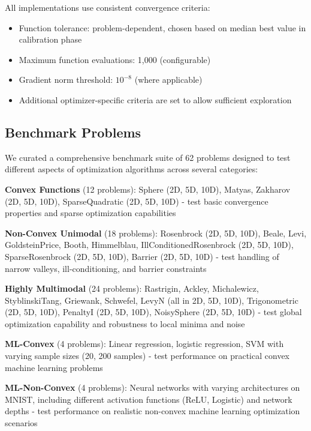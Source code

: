 All implementations use consistent convergence criteria:

\begin{itemize}
\tightlist
\item
  Function tolerance: problem-dependent, chosen based on median best value in calibration phase
\item
  Maximum function evaluations: 1,000 (configurable)
\item
  Gradient norm threshold: \(10^{-8}\) (where applicable)
\item
  Additional optimizer-specific criteria are set to allow sufficient exploration
\end{itemize}

\hypertarget{benchmark-problems}{%
\subsection{Benchmark Problems}\label{benchmark-problems}}

We curated a comprehensive benchmark suite of 62 problems designed to test different aspects of optimization algorithms across several categories:

\textbf{Convex Functions} (12 problems): Sphere (2D, 5D, 10D), Matyas, Zakharov (2D, 5D, 10D), SparseQuadratic (2D, 5D, 10D) - test basic convergence properties and sparse optimization capabilities

\textbf{Non-Convex Unimodal} (18 problems): Rosenbrock (2D, 5D, 10D), Beale, Levi, GoldsteinPrice, Booth, Himmelblau, IllConditionedRosenbrock (2D, 5D, 10D), SparseRosenbrock (2D, 5D, 10D), Barrier (2D, 5D, 10D) - test handling of narrow valleys, ill-conditioning, and barrier constraints

\textbf{Highly Multimodal} (24 problems): Rastrigin, Ackley, Michalewicz, StyblinskiTang, Griewank, Schwefel, LevyN (all in 2D, 5D, 10D), Trigonometric (2D, 5D, 10D), PenaltyI (2D, 5D, 10D), NoisySphere (2D, 5D, 10D) - test global optimization capability and robustness to local minima and noise

\textbf{ML-Convex} (4 problems): Linear regression, logistic regression, SVM with varying sample sizes (20, 200 samples) - test performance on practical convex machine learning problems

\textbf{ML-Non-Convex} (4 problems): Neural networks with varying architectures on MNIST, including different activation functions (ReLU, Logistic) and network depths - test performance on realistic non-convex machine learning optimization scenarios

